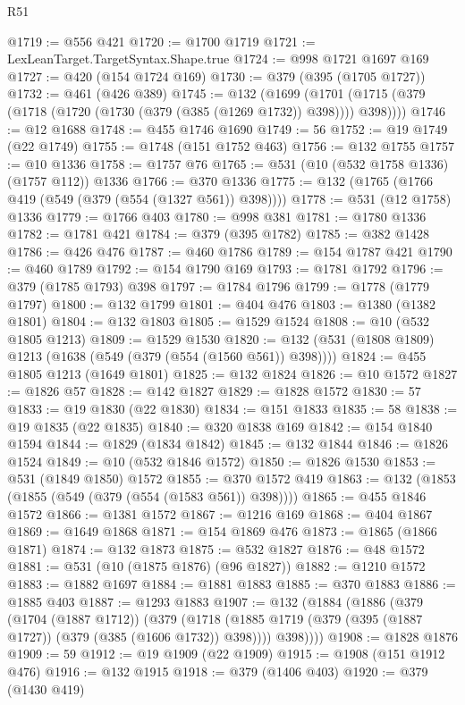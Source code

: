 \begin{lexlean}{R51}
\begin{coremodule}
@1719 := @556 @421
@1720 := @1700 @1719
@1721 := LexLeanTarget.TargetSyntax.Shape.true
@1724 := @998 @1721 @1697 @169
@1727 := @420 (@154 @1724 @169)
@1730 := @379 (@395 (@1705 @1727))
@1732 := @461 (@426 @389)
@1745 := @132
    (@1699 (@1701 (@1715 (@379 (@1718 (@1720 (@1730 (@379 (@385 (@1269 @1732)) @398)))) @398))))
@1746 := @12 @1688
@1748 := @455 @1746 @1690
@1749 := 56
@1752 := @19 @1749 (@22 @1749)
@1755 := @1748 (@151 @1752 @463)
@1756 := @132 @1755
@1757 := @10 @1336
@1758 := @1757 @76
@1765 := @531 (@10 (@532 @1758 @1336) (@1757 @112)) @1336
@1766 := @370 @1336
@1775 := @132 (@1765 (@1766 @419 (@549 (@379 (@554 (@1327 @561)) @398))))
@1778 := @531 (@12 @1758) @1336
@1779 := @1766 @403
@1780 := @998 @381
@1781 := @1780 @1336
@1782 := @1781 @421
@1784 := @379 (@395 @1782)
@1785 := @382 @1428
@1786 := @426 @476
@1787 := @460 @1786
@1789 := @154 @1787 @421
@1790 := @460 @1789
@1792 := @154 @1790 @169
@1793 := @1781 @1792
@1796 := @379 (@1785 @1793) @398
@1797 := @1784 @1796
@1799 := @1778 (@1779 @1797)
@1800 := @132 @1799
@1801 := @404 @476
@1803 := @1380 (@1382 @1801)
@1804 := @132 @1803
@1805 := @1529 @1524
@1808 := @10 (@532 @1805 @1213)
@1809 := @1529 @1530
@1820 := @132 (@531 (@1808 @1809) @1213 (@1638 (@549 (@379 (@554 (@1560 @561)) @398))))
@1824 := @455 @1805 @1213 (@1649 @1801)
@1825 := @132 @1824
@1826 := @10 @1572
@1827 := @1826 @57
@1828 := @142 @1827
@1829 := @1828 @1572
@1830 := 57
@1833 := @19 @1830 (@22 @1830)
@1834 := @151 @1833
@1835 := 58
@1838 := @19 @1835 (@22 @1835)
@1840 := @320 @1838 @169
@1842 := @154 @1840 @1594
@1844 := @1829 (@1834 @1842)
@1845 := @132 @1844
@1846 := @1826 @1524
@1849 := @10 (@532 @1846 @1572)
@1850 := @1826 @1530
@1853 := @531 (@1849 @1850) @1572
@1855 := @370 @1572 @419
@1863 := @132 (@1853 (@1855 (@549 (@379 (@554 (@1583 @561)) @398))))
@1865 := @455 @1846 @1572
@1866 := @1381 @1572
@1867 := @1216 @169
@1868 := @404 @1867
@1869 := @1649 @1868
@1871 := @154 @1869 @476
@1873 := @1865 (@1866 @1871)
@1874 := @132 @1873
@1875 := @532 @1827
@1876 := @48 @1572
@1881 := @531 (@10 (@1875 @1876) (@96 @1827))
@1882 := @1210 @1572
@1883 := @1882 @1697
@1884 := @1881 @1883
@1885 := @370 @1883
@1886 := @1885 @403
@1887 := @1293 @1883
@1907 := @132
    (@1884
      (@1886
        (@379
          (@1704 (@1887 @1712))
          (@379
            (@1718 (@1885 @1719 (@379 (@395 (@1887 @1727)) (@379 (@385 (@1606 @1732)) @398))))
            @398))))
@1908 := @1828 @1876
@1909 := 59
@1912 := @19 @1909 (@22 @1909)
@1915 := @1908 (@151 @1912 @476)
@1916 := @132 @1915
@1918 := @379 (@1406 @403)
@1920 := @379 (@1430 @419)

\end{coremodule}
\end{lexlean}
